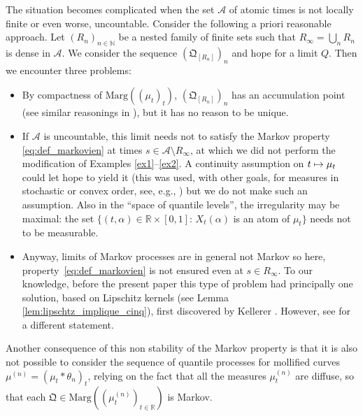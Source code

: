 \documentclass[JEP,XML,SOM,Unicode,NoEqCountersInSection,NoFloatCountersInSection,published]{cedram}
\newcommand\mto{\mathchoice{\longmapsto}{\mapsto}{\mapsto}{\mapsto}}
\theoremstyle{plain}
\theoremstyle{definition}
\newcommand{\como}{\mathfrak{Q}}
\newcommand{\A}{{\mathcal A}}
\newcommand{\ma}{\mathrm{Marg}}
\newcommand{\R}{\mathbb{R}}
\newcommand{\N}{\mathbb{N}}
\begin{document}
The situation becomes complicated when the set $\A$ of atomic times is not locally finite or even worse, uncountable. Consider the following a priori reasonable approach. Let $(R_n)_{n\in \N}$ be a nested family of finite sets such that $R_\infty=\bigcup_n R_n$ is dense in $\A$. We consider the sequence $(\como_{[R_n]})_n$ \label{page:tentative_limite} and hope for a limit $Q$. Then we encounter three problems:
\begin{itemize}
\item
By compactness of $\ma((\mu_t)_t)$, $(\como_{[R_n]})_n$ has an accumulation point (see similar reasonings in \cite{HiRo13,Ju_ejp,KaKr,Lis,Vi2}), but it has no reason to be unique.

\item
If $\A$ is uncountable, this limit needs not to satisfy the Markov property \eqref{eq:def_markovien} at times $s\in\A\setminus R_\infty$, at which we did not perform the modification of Examples \ref{ex1}--\ref{ex2}. A continuity assumption on $t\mto \mu_t$ could let hope to yield it (this was used, with other goals, for measures in stochastic or convex order, see, e.g., \cite{BHS,HiRoYo14}) but we do not make such an assumption. Also in the ``space of quantile levels'', the irregularity may be maximal: the set $\{(t,\alpha)\in\R\times[0,1]:\,X_t(\alpha)$ is an atom of $\mu_t\}$ needs not to be measurable.

\item
Anyway, limits of Markov processes are in general not Markov so here, property~\eqref{eq:def_markovien} is not ensured even at $s\in R_\infty$. To our knowledge, before the present paper this type of problem had principally one solution, based on Lipschitz kernels (see Lemma \ref{lem:lipschtz_implique_cinq}), first discovered by Kellerer \cite{Ke72,Low,HiRoYo14,BeJu16, BHS}. However, see \cite[Lem.\,5.3]{Naga} for a different statement.
\end{itemize}
Another consequence of this non stability of the Markov property is that it is also not possible to consider the sequence of quantile processes for mollified curves $\mu^{(n)}=(\mu_t\ast \theta_n)_t$, relying on the fact that all the measures $\mu_t^{(n)}$ are diffuse, so that each $\como\in\ma((\mu^{(n)}_t)_{t\in\R})$ is Markov.\enlargethispage{.5\baselineskip}%
\end{document}
